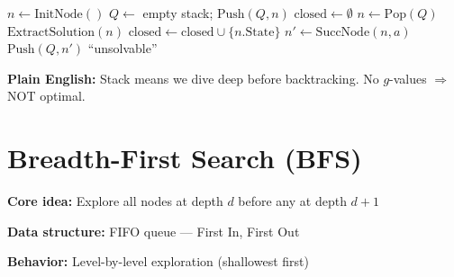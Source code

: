 \documentclass[11pt,a4paper]{article}
\begin{document}
\begin{examplebox}
\begin{algorithmic}
\STATE $n \gets \text{InitNode}()$ 
\STATE $Q \gets$ empty stack; $\text{Push}(Q, n)$ 
\STATE $\text{closed} \gets \emptyset$ 
    \STATE $n \gets \text{Pop}(Q)$ 
        \RETURN $\text{ExtractSolution}(n)$ 
    \ENDIF
    \STATE $\text{closed} \gets \text{closed} \cup \{n.\text{State}\}$ 
     
        \STATE $n' \gets \text{SuccNode}(n, a)$ 
         
            \STATE $\text{Push}(Q, n')$ 
        \ENDIF
    \ENDFOR
\ENDWHILE
\RETURN ``unsolvable'' 
\end{algorithmic}
\textbf{Plain English:} Stack means we dive deep before backtracking. No $g$-values $\Rightarrow$ NOT optimal.
\end{examplebox}

\section{Breadth-First Search (BFS)}

\begin{definitionbox}
\textbf{Core idea:} Explore all nodes at depth $d$ before any at depth $d+1$

\textbf{Data structure:} FIFO queue --- First In, First Out

\textbf{Behavior:} Level-by-level exploration (shallowest first)
\end{definitionbox}
\end{document}

